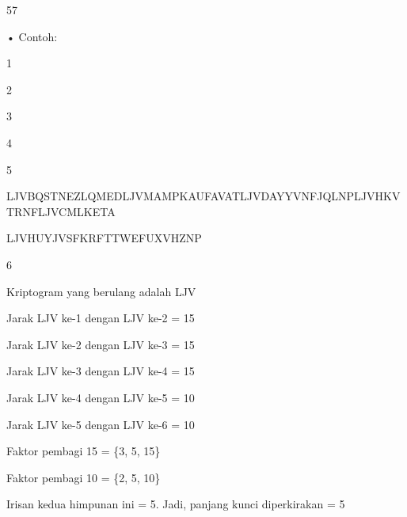 \documentclass{article}
\begin{document}

57

• Contoh: 

      1 


            2 


      3 


            4 

        5 

 LJVBQSTNEZLQMEDLJVMAMPKAUFAVATLJVDAYYVNFJQLNPLJVHKVTRNFLJVCMLKETA 

LJVHUYJVSFKRFTTWEFUXVHZNP

  6 



 Kriptogram yang berulang adalah LJV   


Jarak LJV ke-1 dengan LJV ke-2 = 15 



Jarak LJV ke-2 dengan LJV ke-3 = 15 


Jarak LJV ke-3 dengan LJV ke-4 = 15


Jarak LJV ke-4 dengan LJV ke-5 = 10


Jarak LJV ke-5 dengan LJV ke-6 = 10

 Faktor pembagi 15 = \{3, 5, 15\}

 Faktor pembagi 10 = \{2, 5, 10\}

 Irisan kedua himpunan ini = 5. Jadi, panjang kunci diperkirakan = 5
\end{document}
